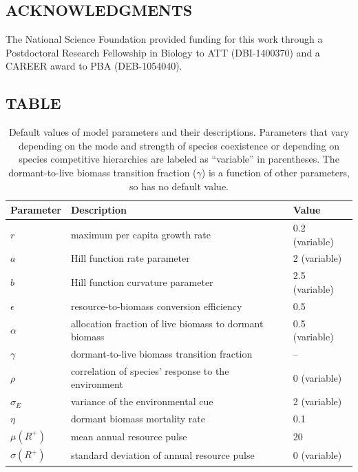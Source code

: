 \documentclass[12pt,]{article}
\begin{document}
\subsection{ACKNOWLEDGMENTS}\label{acknowledgments}

The National Science Foundation provided funding for this work through a
Postdoctoral Research Fellowship in Biology to ATT (DBI-1400370) and a
CAREER award to PBA (DEB-1054040).

\newpage{}

\subsection{TABLE}\label{table}

\begin{table}[!htbp]
\footnotesize
\caption{Default values of model parameters and their descriptions. Parameters that vary depending on the mode and strength of species coexistence or depending on species competitive hierarchies are labeled as ``variable'' in parentheses. The dormant-to-live biomass transition fraction ($\gamma$) is a function of other parameters, so has no default value.}
\begin{tabular}{l l l}
\hline
Parameter & Description & Value \\
\hline
$r$ & maximum per capita growth rate & 0.2 (variable) \\
$a$ & Hill function rate parameter & 2 (variable) \\
$b$ & Hill function curvature parameter & 2.5 (variable) \\
$\epsilon$ & resource-to-biomass conversion efficiency & 0.5 \\
$\alpha$ & allocation fraction of live biomass to dormant biomass & 0.5 (variable) \\
$\gamma$ & dormant-to-live biomass transition fraction & -- \\
$\rho$ & correlation of species' response to the environment & 0 (variable) \\
$\sigma_E$ & variance of the environmental cue & 2 (variable) \\
$\eta$ & dormant biomass mortality rate & 0.1 \\
$\mu(R^+)$ & mean annual resource pulse & 20 \\
$\sigma(R^+)$ & standard deviation of annual resource pulse & 0 (variable) \\
\hline
\end{tabular}
\end{table}
\end{document}
